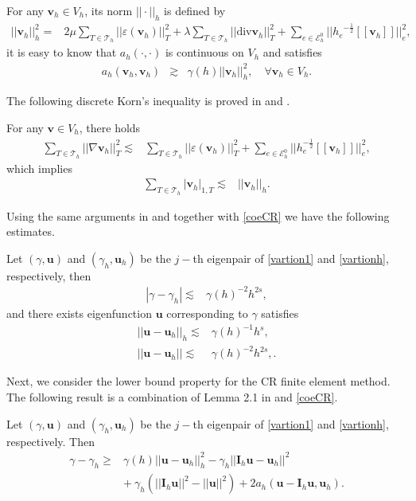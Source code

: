 \documentclass[leqno,CJK]{siamltex704}
\numberwithin{equation}{section}
\def\E{{\mathcal{E}}}
\def\sumT{\sum_{T\in\mathcal{T}_h}}     %
\def\bu{{\mathbf{u}}}
\def\bv{{\mathbf{v}}}
\def\bi{{\mathbf{I}}}
\newcommand{\eps}{\varepsilon}
\newcommand{\di}{\text{div}}
\begin{document}
For any $\bv_h\in V_h$, its norm $||\cdot||_h$ is defined by
\begin{align*}
	||\bv_h||_h^2=&2\mu\sumT||\eps(\bv_h)||_T^2+\lambda\sumT||\di\bv_h||_T^2+\sum\limits_{e\in\E_h^0}||{h_e}^{-\frac12}[\![\bv_h]\!]||_e^2,
\end{align*}
it is easy to know that $a_h(\cdot,\cdot)$ is continuous on $V_h$ and satisfies
\begin{eqnarray}\label{coeCR}
	a_h(\bv_h,\bv_h)&\gtrsim&\gamma(h)||\bv_h||_h^2,\quad\forall\bv_h\in V_h.
\end{eqnarray}

The following discrete Korn's inequality is proved in \cite{Korn2004} and \cite{Korn2000}.
\begin{lemma}For any $\bv\in V_h$, there holds
	\begin{align*}
		\sumT||\nabla\bv_h||_T^2\lesssim& \sumT||\eps(\bv_h)||_T^2+\sum\limits_{e\in\E_h^0}||h_e^{-{\frac{1}{2}}}[\![\bv_h]\!]||_e^2,
	\end{align*}
	which implies
	\begin{align*}
		\sumT|\bv_h|_{1,T}\lesssim& ||\bv_h||_h.
	\end{align*}
\end{lemma}

Using the same arguments in \cite{Zhang2023} and together with \eqref{coeCR} we have the following estimates.
\begin{lemma}
	Let $(\gamma,\bu)$ and $(\gamma_h,\bu_h)$ be the $j-$th eigenpair of \eqref{vartion1} and \eqref{vartionh}, respectively, then
	\begin{align}
		|\gamma-\gamma_h|\lesssim&\gamma(h)^{-2}h^{2s},
	\end{align}
	and there exists eigenfunction $\bu$ corresponding to $\gamma$ satisfies
	\begin{align}
		||\bu-\bu_h||_h\lesssim& \gamma(h)^{-1}h^s,\label{errH1}\\
		||\bu-\bu_h||\lesssim& \gamma(h)^{-2}h^{2s},\label{errL2}.
	\end{align}
\end{lemma}

Next, we consider the lower bound property for the CR finite element method. The following result is a combination of Lemma 2.1 in \cite{Luo2012} and \eqref{coeCR}.
\begin{theorem}
	Let $(\gamma,\bu)$ and $(\gamma_h,\bu_h)$ be the $j-$th eigenpair of \eqref{vartion1} and \eqref{vartionh}, respectively. Then
	\begin{align}\label{expand}
		\gamma-\gamma_h\ge& \gamma(h)||\bu-\bu_h||_h^2-\gamma_h||\bi_h\bu-\bu_h||^2\\
		&+~\gamma_h(||\bi_h\bu||^2-||\bu||^2)+2a_h(\bu-\bi_h\bu,\bu_h).\nonumber
	\end{align}
\end{theorem}
\end{document}
